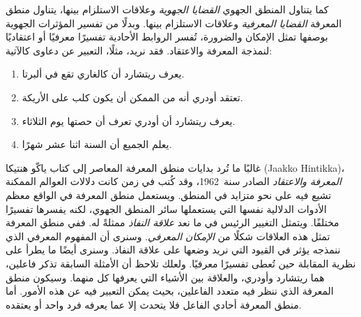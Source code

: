 \documentclass[../../../include/open-logic-section]{subfiles}
\begin{document}


كما يتناول المنطق الجهوي \emph{القضايا الجهوية} وعلاقات الاستلزام بينها،
يتناول منطق المعرفة \emph{القضايا المعرفية} وعلاقات الاستلزام بينها. وبدلًا
من تفسير المؤثرات الجهوية بوصفها تمثل الإمكان والضرورة، تُفسر الروابط
الأحادية تفسيرًا معرفيًا أو اعتقاديًا لنمذجة المعرفة والاعتقاد. فقد نريد،
مثلًا، التعبير عن دعاوى كالآتية:

\begin{enumerate}
\item يعرف ريتشارد أن كالغاري تقع في ألبرتا.
\item تعتقد أودري أنه من الممكن أن يكون كلب على الأريكة.
\item يعرف ريتشارد أن أودري تعرف أن حصتها يوم الثلاثاء.
\item يعلم الجميع أن السنة اثنا عشر شهرًا.
\end{enumerate}
غالبًا ما تُرد بدايات منطق المعرفة المعاصر إلى كتاب ياكّو هنتيكا
(Jaakko Hintikka)،
\emph{المعرفة والاعتقاد} الصادر سنة~1962، وقد كُتب في زمن كانت دلالات
العوالم الممكنة تشيع فيه على نحو متزايد في المنطق. ويستعمل منطق المعرفة في
الواقع معظم الأدوات الدلالية نفسها التي يستعملها سائر المنطق الجهوي، لكنه
يفسرها تفسيرًا مختلفًا. ويتمثل التغيير الرئيس في ما نعد
\emph{علاقة النفاذ} ممثلةً له. ففي منطق المعرفة تمثل هذه العلاقات شكلًا
من \emph{الإمكان المعرفي}. وسنرى أن المفهوم المعرفي الذي ننمذجه يؤثر في
القيود التي نريد وضعها على علاقة النفاذ. وسنرى أيضًا ما يطرأ على نظرية
المقابلة حين تُعطى تفسيرًا معرفيًا. ولعلك تلاحظ أن الأمثلة السابقة تذكر
فاعلين، هما ريتشارد وأودري، والعلاقة بين الأشياء التي يعرفها كل منهما.
وسيكون منطق المعرفة الذي ننظر فيه متعدد الفاعلين، بحيث يمكن التعبير فيه عن
هذه الأمور. أما منطق المعرفة أحادي الفاعل فلا يتحدث إلا عما يعرفه فرد واحد
أو يعتقده.
\end{document}

